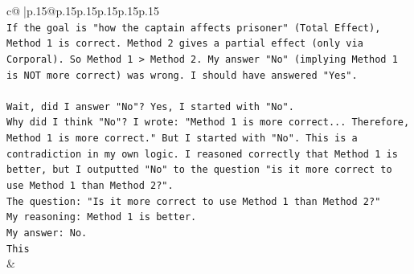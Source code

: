 \documentclass{article}
\begin{document}
{\begin{supertabular}{c@{$\;$}|p{.15\linewidth}@{}p{.15\linewidth}p{.15\linewidth}p{.15\linewidth}p{.15\linewidth}p{.15\linewidth}}
{{{\\ 
\texttt{If the goal is "how the captain affects prisoner" (Total Effect), Method 1 is correct. Method 2 gives a partial effect (only via Corporal). So Method 1 > Method 2. My answer "No" (implying Method 1 is NOT more correct) was wrong. I should have answered "Yes".} \\
\\ 
\texttt{Wait, did I answer "No"? Yes, I started with "No".} \\
\texttt{Why did I think "No"? I wrote: "Method 1 is more correct... Therefore, Method 1 is more correct." But I started with "No". This is a contradiction in my own logic. I reasoned correctly that Method 1 is better, but I outputted "No" to the question "is it more correct to use Method 1 than Method 2?".} \\
\texttt{The question: "Is it more correct to use Method 1 than Method 2?"} \\
\texttt{My reasoning: Method 1 is better.} \\
\texttt{My answer: No.} \\
\texttt{This} \\
            }
        }
    }
    & \\ \\

\end{supertabular}
}
\end{document}
